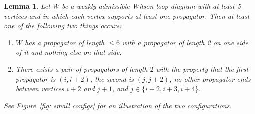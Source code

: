 \documentclass[11pt]{article}
\newtheorem{lem}[thm]{Lemma}
\theoremstyle{remark}
\theoremstyle{definition}
\begin{document}
\begin{lem}\label{lem sian}
  Let $W$ be a weakly admissible Wilson loop diagram with at least 5 vertices and in which each vertex supports at least one propagator.  Then at least one of the following two things occurs:
  \vspace{-0.5em}
  \begin{enumerate}
    \item $W$ has a propagator of length $\leq 6$ with a propagator of length 2 on one side of it and nothing else on that side.\label{item big and 2}
    \item There exists a pair of propagators of length $2$ with the property that the first propagator is $(i, i+2)$, the second is $(j, j+2)$, no other propagator ends between vertices $i+2$ and $j+1$, and $j\in\{i+2, i+3, i+4\}$.\label{item pair of 2s}
  \end{enumerate}
See Figure~\ref{fig: small configs} for an illustration of the two configurations.
\end{lem}
\end{document}

